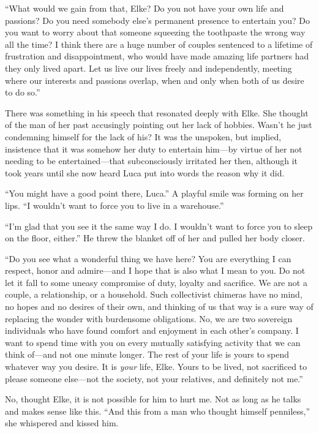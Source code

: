 ``What would we gain from that, Elke? Do you not have your own life and passions? Do you need somebody else's permanent presence to entertain you? Do you want to worry about that someone squeezing the toothpaste the wrong way all the time? I think there are a huge number of couples sentenced to a lifetime of frustration and disappointment, who would have made amazing life partners had they only lived apart. Let us live our lives freely and independently, meeting where our interests and passions overlap, when and only when both of us desire to do so.''

There was something in his speech that resonated deeply with Elke. She thought of the man of her past accusingly pointing out her lack of hobbies. Wasn't he just condemning himself for the lack of his? It was the unspoken, but implied, insistence that it was somehow her duty to entertain him---by virtue of her not needing to be entertained---that subconsciously irritated her then, although it took years until she now heard Luca put into words the reason why it did.

``You might have a good point there, Luca.'' A playful smile was forming on her lips. ``I wouldn't want to force you to live in a warehouse.''

``I'm glad that you see it the same way I do. I wouldn't want to force you to sleep on the floor, either.'' He threw the blanket off of her and pulled her body closer.

``Do you see what a wonderful thing we have here? You are everything I can respect, honor and admire---and I hope that is also what I mean to you. Do not let it fall to some uneasy compromise of duty, loyalty and sacrifice. We are not a couple, a relationship, or a household. Such collectivist chimeras have no mind, no hopes and no desires of their own, and thinking of us that way is a sure way of replacing the wonder with burdensome obligations. No, we are two sovereign individuals who have found comfort and enjoyment in each other's company. I want to spend time with you on every mutually satisfying activity that we can think of---and not one minute longer. The rest of your life is yours to spend whatever way you desire. It is \emph{your} life, Elke. Yours to be lived, not sacrificed to please someone else---not the society, not your relatives, and definitely not me.''

No, thought Elke, it is not possible for him to hurt me. Not as long as he talks and makes sense like this. ``And this from a man who thought himself penniless,'' she whispered and kissed him.

